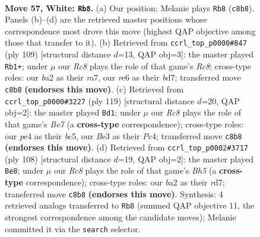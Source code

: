 \documentclass[11pt]{article}
\begin{document}
\clearpage

\begin{figure}[p]\centering
\begin{subfigure}{0.46\textwidth}\centering
\resizebox{\linewidth}{!}{%
\newchessgame
\chessboard[
  setfen={2R5/6k1/4r3/8/B3p2p/4Bp1P/b4P2/5K2 w - - 24 57},
  showmover=false,
  pgfstyle=straightmove, color=movearrow, markmove={c8-b8}
]}
\caption{}
\end{subfigure}\hfill
\begin{subfigure}{0.46\textwidth}\centering
\resizebox{\linewidth}{!}{%
\newchessgame
\chessboard[
  setfen={5k2/R2B1p2/3p4/4b1pP/1K2P1P1/8/8/2r5 b - - 26 55},
  showmover=false,
  pgfstyle=straightmove, color=movearrow, markmove={c1-b1}
]}
\caption{}
\end{subfigure}
\\[4pt]
\begin{subfigure}{0.46\textwidth}\centering
\resizebox{\linewidth}{!}{%
\newchessgame
\chessboard[
  setfen={8/8/p7/P1Bp1k2/2p4K/2P1P3/4b1P1/8 b - - 8 60},
  showmover=false,
  pgfstyle=straightmove, color=movearrow, markmove={e2-d1}
]}
\caption{}
\end{subfigure}\hfill
\begin{subfigure}{0.46\textwidth}\centering
\resizebox{\linewidth}{!}{%
\newchessgame
\chessboard[
  setfen={8/3r2k1/7p/1p5B/1Bp2P2/2P3K1/8/8 w - - 3 55},
  showmover=false,
  pgfstyle=straightmove, color=movearrow, markmove={h5-e8}
]}
\caption{}
\end{subfigure}
\caption{\textbf{Move 57, White: \texttt{Rb8}.} (a) Our position; Melanie plays \texttt{Rb8} (\texttt{c8b8}). Panels (b)--(d) are the retrieved master positions whose correspondence most drove this move (highest QAP objective among those that transfer to it). (b) Retrieved from \texttt{ccrl\_top\_p0000\#847} (ply 109) [structural distance $d$=13, QAP obj=3]: the master played \texttt{Rb1+}; under $\mu$ our \emph{Rc8} plays the role of that game's \emph{Rc8}; cross-type roles: our \emph{b}a2 as their \emph{r}a7, our \emph{r}e6 as their \emph{b}d7; transferred move \texttt{c8b8} \textbf{(endorses this move)}. (c) Retrieved from \texttt{ccrl\_top\_p0000\#3227} (ply 119) [structural distance $d$=20, QAP obj=2]: the master played \texttt{Bd1}; under $\mu$ our \emph{Rc8} plays the role of that game's \emph{Be7} (a \textbf{cross-type} correspondence); cross-type roles: our \emph{p}e4 as their \emph{b}c5, our \emph{B}e3 as their \emph{P}c4; transferred move \texttt{c8b8} \textbf{(endorses this move)}. (d) Retrieved from \texttt{ccrl\_top\_p0002\#3717} (ply 108) [structural distance $d$=19, QAP obj=2]: the master played \texttt{Be8}; under $\mu$ our \emph{Rc8} plays the role of that game's \emph{Bh5} (a \textbf{cross-type} correspondence); cross-type roles: our \emph{b}a2 as their \emph{r}d7; transferred move \texttt{c8b8} \textbf{(endorses this move)}. Synthesis: 4 retrieved analogs transferred to \texttt{Rb8} (summed QAP objective 11, the strongest correspondence among the candidate moves); Melanie committed it via the \texttt{search} selector.}
\label{fig:thought-m112}
\end{figure}
\end{document}
